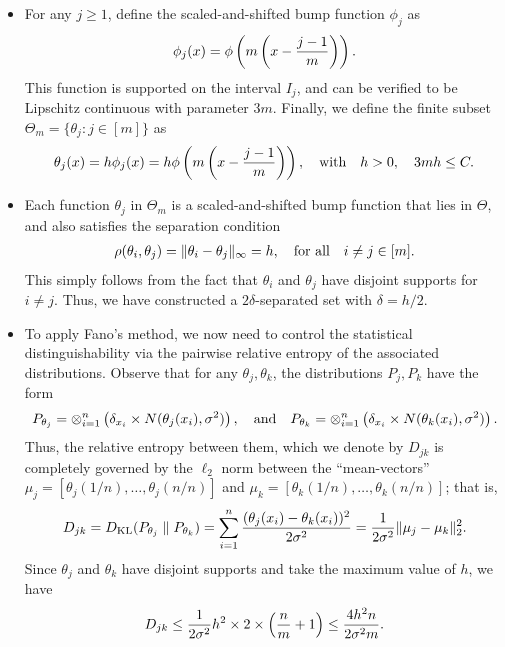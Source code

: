 \documentclass[12pt]{article}
\begin{document}
\begin{itemize}
	\item For any $j \geq 1$, define the scaled-and-shifted bump function $\phi_j$ as 
	\begin{align}
		\phi_j(x) = \phi\left( m\left( x - \frac{j-1}{m} \right) \right). 
	\end{align}
	This function is supported on the interval $I_j$, and can be verified to be Lipschitz continuous with parameter $3 m$. Finally, we define the finite subset $\Theta_m = \{\theta_j: j \in [m]\}$ as 
	\begin{align}
		\theta_j(x)= h \phi_j(x) = h \phi\left( m \left( x - \frac{j-1}{m} \right) \right), \quad \text{with} \quad h > 0, \quad 3 m h \leq C. 
	\end{align}
	\item Each function $\theta_j$ in $\Theta_m$  is a scaled-and-shifted bump function that lies in $\Theta$, and also satisfies the separation condition 
	\begin{align}
		\rho(\theta_i, \theta_j) = \|\theta_i - \theta_j\|_\infty = h, \quad \text{for all} \quad i \neq j \in [m]. 
	\end{align}
	This simply follows from the fact that $\theta_i$ and $\theta_j$ have disjoint supports for $i \neq j$. Thus, we have constructed a $2\delta$-separated set with $\delta = h/2$. 
	\item To apply Fano's method, we now need to control the statistical distinguishability via the pairwise relative entropy of the associated distributions. Observe that for any $\theta_j, \theta_k$, the distributions $P_j, P_k$ have the form 
	\begin{align}
		P_{\theta_j} = \otimes_{i=1}^n \left( \delta_{x_i} \times N(\theta_j(x_i), \sigma^2) \right), \quad \text{and} \quad 
		P_{\theta_k} = \otimes_{i=1}^n \left( \delta_{x_i} \times N(\theta_k(x_i), \sigma^2) \right). 
	\end{align}
	\sloppy Thus, the relative entropy between them, which we denote by $D_{jk}$ is completely governed by the $\ell_2$ norm between the ``mean-vectors'' $\mu_j = [\theta_j(1/n), \ldots, \theta_j(n/n) ]$ and $\mu_k= [\theta_k(1/n), \ldots, \theta_k(n/n) ]$; that is, 
	\begin{align}
	D_{jk}= D_{\text{KL}}(P_{\theta_j} \parallel P_{\theta_k}) = \sum_{i=1}^n \frac{(\theta_j(x_i) - \theta_k(x_i))^2}{2 \sigma^2} = \frac{1}{2\sigma^2} \|\mu_j - \mu_k\|_2^2. 
	\end{align}
	Since $\theta_j$ and $\theta_k$ have disjoint supports and take the maximum value of $h$, we have 
	\begin{align}
		D_{jk} \leq \frac{1}{2\sigma^2} h^2 \times 2 \times \lp \frac{n}{m}  + 1\rp \leq \frac{4 h^2 n}{2 \sigma^2 m}. 

\end{align}
\end{itemize}
\end{document}
